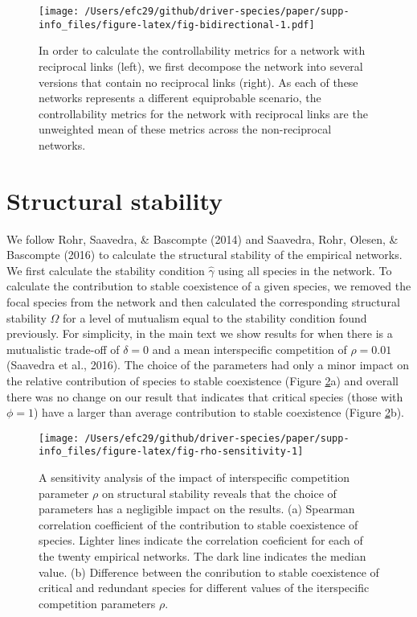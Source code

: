 \documentclass[a4paper]{artikel1}
\theoremstyle{definition}
\theoremstyle{definition}
\theoremstyle{definition}
\theoremstyle{remark}
\begin{document}
\begin{figure}
\centering
\texttt{[image: /Users/efc29/github/driver-species/paper/supp-info\_files/figure-latex/fig-bidirectional-1.pdf]}
\caption{\label{fig:fig-bidirectional}In order to calculate the
controllability metrics for a network with reciprocal links (left), we
first decompose the network into several versions that contain no
reciprocal links (right). As each of these networks represents a
different equiprobable scenario, the controllability metrics for the
network with reciprocal links are the unweighted mean of these metrics
across the non-reciprocal networks.}
\end{figure}

\clearpage

\section{Structural stability}\label{structural-stability}

We follow Rohr, Saavedra, \& Bascompte (2014) and Saavedra, Rohr,
Olesen, \& Bascompte (2016) to calculate the structural stability of the
empirical networks. We first calculate the stability condition
\(\hat{\gamma}\) using all species in the network. To calculate the
contribution to stable coexistence of a given species, we removed the
focal species from the network and then calculated the corresponding
structural stability \(\Omega\) for a level of mutualism equal to the
stability condition found previously. For simplicity, in the main text
we show results for when there is a mutualistic trade-off of
\(\delta = 0\) and a mean interspecific competition of \(\rho = 0.01\)
(Saavedra et al., 2016). The choice of the parameters had only a minor
impact on the relative contribution of species to stable coexistence
(Figure \ref{fig:fig-rho-sensitivity}a) and overall there was no change
on our result that indicates that critical species (those with
\(\phi = 1\)) have a larger than average contribution to stable
coexistence (Figure \ref{fig:fig-rho-sensitivity}b).

\begin{figure}[p]

{\centering \texttt{[image: /Users/efc29/github/driver-species/paper/supp-info\_files/figure-latex/fig-rho-sensitivity-1]} 

}

\caption{A sensitivity analysis of the impact of interspecific competition parameter $\rho$ on structural stability reveals that the choice of parameters has a negligible impact on the results. (a) Spearman correlation coefficient of the contribution to stable coexistence of species. Lighter lines indicate the correlation coeficient for each of the twenty empirical networks. The dark line indicates the median value. (b) Difference between the conribution to stable coexistence of critical and redundant species for different values of the iterspecific competition parameters $\rho$.}\label{fig:fig-rho-sensitivity}
\end{figure}
\end{document}

